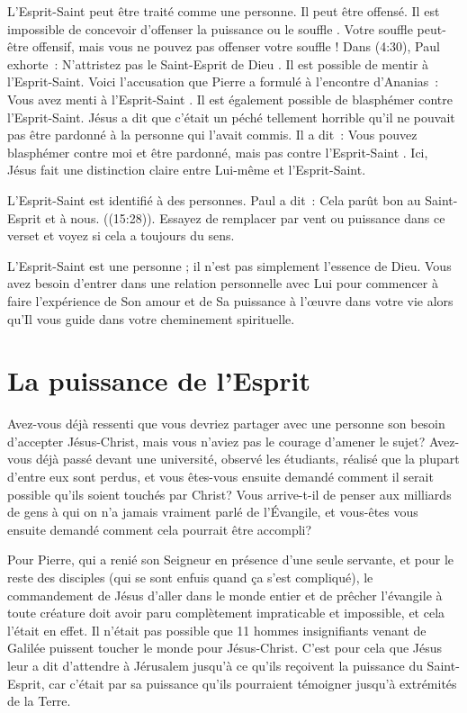 L'Esprit-Saint peut être traité comme une personne. Il peut être offensé. Il est impossible de concevoir d'offenser \og la puissance \fg{} ou \og le souffle \fg{}. Votre souffle peut-être offensif, mais vous ne pouvez pas offenser votre souffle ! Dans (4:30), Paul exhorte~: \og N'attristez pas le Saint-Esprit de Dieu \fg{}. Il est possible de mentir à l'Esprit-Saint. Voici l'accusation que Pierre a formulé à l'encontre d'Ananias~: \og Vous avez menti à l'Esprit-Saint \fg{}. Il est également possible de blasphémer contre l'Esprit-Saint. Jésus a dit que c'était un péché tellement horrible qu'il ne pouvait pas être pardonné à la personne qui l'avait commis. Il a dit~: \og Vous pouvez blasphémer contre moi et être pardonné, mais pas contre l'Esprit-Saint \fg{}. Ici, Jésus fait une distinction claire entre Lui-même et l'Esprit-Saint.

L'Esprit-Saint est identifié à des personnes. Paul a dit~: \og Cela parût bon au Saint-Esprit et à nous. \fg{} ((15:28)). Essayez de remplacer par vent ou puissance dans ce verset et voyez si cela a toujours du sens.

L'Esprit-Saint est une personne ; il n'est pas simplement l'essence de Dieu. Vous avez besoin d'entrer dans une relation personnelle avec Lui pour commencer à faire l'expérience de Son amour et de Sa puissance à l'œuvre dans votre vie alors qu'Il vous guide dans votre cheminement spirituelle.


\section*{La puissance de l'Esprit}

Avez-vous déjà ressenti que vous devriez partager avec une personne son besoin d'accepter Jésus-Christ, mais vous n'aviez pas le courage d'amener le sujet? Avez-vous déjà passé devant une université, observé les étudiants, réalisé que la plupart d'entre eux sont perdus, et vous êtes-vous ensuite demandé comment il serait possible qu'ils soient touchés par Christ? Vous arrive-t-il de penser aux milliards de gens à qui on n'a jamais vraiment parlé de l'Évangile, et vous-êtes vous ensuite demandé comment cela pourrait être accompli?

Pour Pierre, qui a renié son Seigneur en présence d'une seule servante, et pour le reste des disciples (qui se sont enfuis quand ça s'est compliqué), le commandement de Jésus d'aller dans le monde entier et de prêcher l'évangile à toute créature doit avoir paru complètement impraticable et impossible, et cela l'était en effet. Il n'était pas possible que 11 hommes insignifiants venant de Galilée puissent toucher le monde pour Jésus-Christ. C'est pour cela que Jésus leur a dit d'attendre à Jérusalem jusqu'à ce qu'ils reçoivent la puissance du Saint-Esprit, car c'était par sa puissance qu'ils pourraient témoigner jusqu'à extrémités de la Terre.


